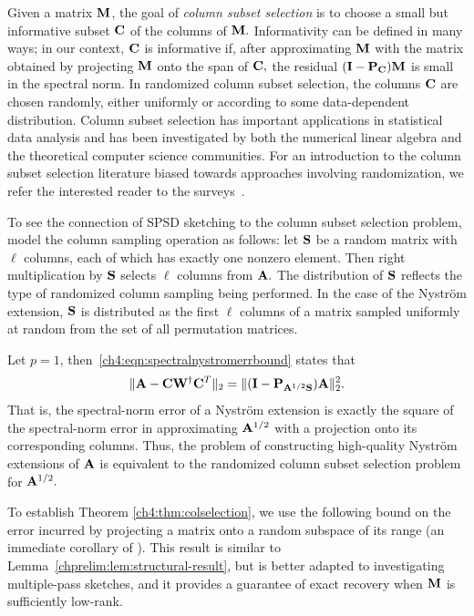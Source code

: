 \begin{remark}

Given a matrix $\mathbf{M}$, the goal of \emph{column subset selection} is to choose a small but
informative subset $\mathbf{C}$ of the columns of $\mathbf{M}.$ Informativity can be
defined in many ways; in our context, $\mathbf{C}$ is informative if, after
approximating $\mathbf{M}$ with the matrix obtained by projecting $\mathbf{M}$ onto
the span of $\mathbf{C},$ the residual $(\mathbf{I} - \mathbf{P}_{\mathbf{C}})\mathbf{M}$ is
small in the spectral norm. In randomized column subset selection, the columns $\mathbf{C}$
are chosen randomly, either uniformly or according to some data-dependent
distribution. Column subset selection has important applications in statistical
data analysis and has been investigated by both the numerical linear algebra and
the theoretical computer science communities. For an introduction to the column
subset selection literature biased towards approaches involving randomization,
we refer the interested reader to the surveys~\cite{MM10,MM11}.

 To see the connection of SPSD sketching to the column subset selection problem, model the 
 column sampling operation as follows: let $\mathbf{S}$ be a random matrix with 
 $\ell$ columns, each of which has exactly one nonzero element. Then
right multiplication by $\mathbf{S}$ selects  $\ell$ columns from $\mathbf{A}.$
The distribution of $\mathbf{S}$ reflects the type of randomized column sampling 
being performed. In the case of the Nystr\"om extension, $\mathbf{S}$ is 
distributed as the first $\ell$ columns of a matrix sampled uniformly at 
random from the set of all permutation matrices.

Let $p=1$, then~\eqref{ch4:eqn:spectralnystromerrbound} states that 
\[
 \|\mathbf{A} - \mathbf{C} \mathbf{W}^\dagger \mathbf{C}^T\|_2 = \|(\mathbf{I} - \mathbf{P}_{\mathbf{A}^{1/2}\mathbf{S}})\mathbf{A}\|_2^2.
\]
That is, the spectral-norm error of a Nystr\"om extension is exactly the square of the spectral-norm error in
approximating $\mathbf{A}^{1/2}$ with a projection onto its corresponding columns. 
Thus, the problem of constructing high-quality Nystr\"om extensions of $\mathbf{A}$ is equivalent to the 
randomized column subset selection problem for $\mathbf{A}^{1/2}.$
\end{remark}

To establish Theorem \ref{ch4:thm:colselection}, we use the following bound on the
error incurred by projecting a matrix onto a random subspace of its range
(an immediate corollary of \cite[Theorems 9.1 and 9.2]{HMT11}). This result is similar to 
Lemma~\ref{chprelim:lem:structural-result}, but is better adapted to investigating
multiple-pass sketches, and it provides a guarantee
of exact recovery when $\mathbf{M}$ is sufficiently low-rank.

